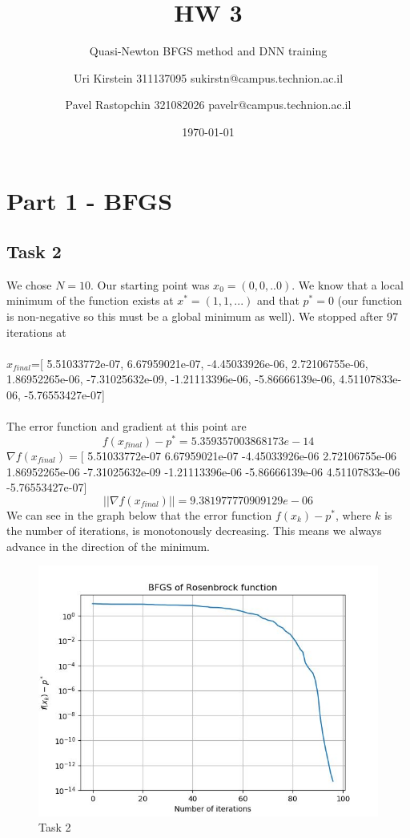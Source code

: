 \documentclass[12pt]{scrartcl}
\begin{document}

\titlehead{CS department, Technion}
\subject{Introduction to Optimization and Deep Learning 236330}
\title{HW 3}
\subtitle{Quasi-Newton BFGS method and DNN training}
\author{Uri Kirstein 311137095 \hfill sukirstn@campus.technion.ac.il\and Pavel Rastopchin 321082026 pavelr@campus.technion.ac.il}
\date{\today}
\maketitle

\section*{Part 1 - BFGS}
\subsection*{Task 2}
We chose $N=10$. Our starting point was $x_0=(0,0,..0)$. We know that a local minimum of the function exists at $x^*=(1,1,...)$ and that $p^*=0$ (our function is non-negative so this must be a global minimum as well). We stopped after 97 iterations at\\\\
$x_{final}$=[ 5.51033772e-07,  6.67959021e-07, -4.45033926e-06, 
2.72106755e-06, 1.86952265e-06, -7.31025632e-09, -1.21113396e-06, -5.86666139e-06, 4.51107833e-06, -5.76553427e-07]\\\\
The error function and gradient at this point are $$f(x_{final})-p^*=5.359357003868173e-14$$
$\nabla f(x_{final})=$[ 5.51033772e-07  6.67959021e-07 -4.45033926e-06  2.72106755e-06\\
  1.86952265e-06 -7.31025632e-09 -1.21113396e-06 -5.86666139e-06
  4.51107833e-06\\ -5.76553427e-07]
$$||\nabla f(x_{final})|| = 9.381977770909129e-06$$
We can see in the graph below that the error function $f(x_k)-p^*$, where $k$ is the number of iterations, is monotonously decreasing. This means we always advance in the direction of the minimum.
\begin{figure}[ht!]
	\hfill\includegraphics[width=\linewidth]{rosenbrock_graph.jpg}\hspace*{\fill}
	\caption{Task 2}
\end{figure}
\end{document}
